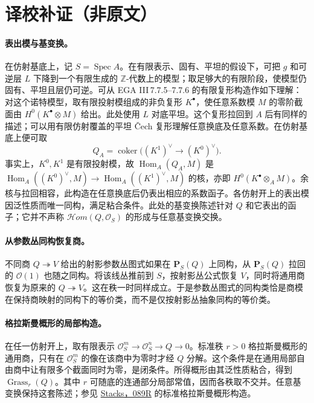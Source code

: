 \documentclass[openany,fontset=fandol]{ctexbook}
\DeclareMathOperator{\Spec}{Spec}
\DeclareMathOperator{\Hom}{Hom}
\DeclareMathOperator{\Grass}{Grass}
\newcommand{\OO}{\mathcal O}
\newcommand{\HH}{\mathcal{H}\!om}
\newcommand{\PP}{\mathbf P}
\begin{document}
\section*{译校补证（非原文）}
\paragraph{表出模与基变换。}
在仿射基底上，记 \(S=\Spec A\)。在有限表示、固有、平坦的假设下，可把 \(g\) 和可逆层 \(L\) 下降到一个有限生成的 \(\mathbb Z\)-代数上的模型；取足够大的有限阶段，使模型仍固有、平坦且层仍可逆。可从 EGA III\,7.7.5--7.7.6 的有限复形构造作如下理解：对这个诺特模型，取有限投射模组成的非负复形 \(K^\bullet\)，使任意系数模 \(M\) 的零阶截面由 \(H^0(K^\bullet\otimes M)\) 给出。此处使用 \(L\) 对底平坦。这个复形拉回到 \(A\) 后有同样的描述；可以用有限仿射覆盖的平坦 \v{C}ech 复形理解任意换底及任意系数。在仿射基底上便可取
\[
 Q_A=\operatorname{coker}\bigl((K^1)^\vee\longrightarrow (K^0)^\vee\bigr).
\]
事实上，\(K^0,K^1\) 是有限投射模，故 \(\Hom_A(Q_A,M)\) 是
\(\Hom_A((K^0)^\vee,M)\to\Hom_A((K^1)^\vee,M)\) 的核，亦即 \(H^0(K^\bullet\otimes_A M)\)。余核与拉回相容，此构造在任意换底后仍表出相应的系数函子。各仿射开上的表出模因泛性质而唯一同构，满足粘合条件。此处的基变换陈述针对 \(Q\) 和它表出的函子；它并不声称 \(\HH(Q,\OO_S)\) 的形成与任意基变换交换。

\paragraph{从参数丛同构恢复商。}
不同商 \(Q\twoheadrightarrow V\) 给出的射影参数丛图式如果在 \(\PP_S(Q)\) 上同构，从 \(\PP_S(Q)\) 拉回的 \(\OO(1)\) 也随之同构。将该线丛推前到 \(S\)，按射影丛公式恢复 \(V\)，同时将通用商恢复为原来的 \(Q\twoheadrightarrow V\)。这在秩一时同样成立。于是参数丛图式的同构类恰是商模在保持商映射的同构下的等价类，而不是仅按射影丛抽象同构的等价类。

\paragraph{格拉斯曼概形的局部构造。}
在任一仿射开上，取有限表示 \(\OO_S^m\to\OO_S^n\to Q\to0\)。标准秩 \(r>0\) 格拉斯曼概形的通用商，只有在 \(\OO_S^m\) 的像在该商中为零时才经 \(Q\) 分解。这个条件是在通用局部自由商中让有限多个截面同时为零，是闭条件。所得概形由其泛性质粘合，得到 \(\Grass_r(Q)\)。其中 \(r\) 可随底的连通部分局部常值，因而各秩取不交并。任意基变换保持这套陈述；参见 \href{https://stacks.math.columbia.edu/tag/089R}{Stacks，089R} 的标准格拉斯曼概形构造。
\end{document}
